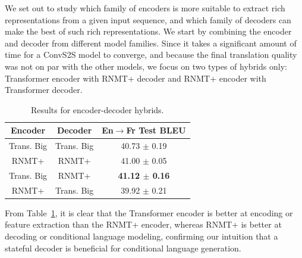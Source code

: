 \documentclass[11pt,a4paper]{article}
\begin{document}
We set out to study which family of encoders
is more suitable to extract rich representations from a given input sequence,
and which family of decoders can make the best of such rich representations.
We start by combining the encoder and decoder from different
model families. Since it takes a significant amount of time for a
ConvS2S model to converge, and because the final translation quality
was not on par with the other models, we focus on two types of
hybrids only: Transformer encoder with RNMT+ decoder and RNMT+ encoder with
Transformer decoder.

\begin{table}[!htbp]
\centering
\begin{tabular}{c|c|c}
\hline \hline
Encoder & Decoder & En$\rightarrow$Fr Test BLEU \\ \hline
Trans. Big    & Trans. Big                    & 40.73 $\pm$ 0.19     \\
RNMT+    & RNMT+                    & 41.00 $\pm$ 0.05     \\
Trans. Big    & RNMT+                    & \textbf{41.12 $\pm$ 0.16}     \\
RNMT+     & Trans. Big          & 39.92 $\pm$ 0.21      \\ \hline
\end{tabular}
\caption{Results for encoder-decoder hybrids.}
\label{table:hybrids_encdec}
\end{table}

From Table~\ref{table:hybrids_encdec}, it is clear that the Transformer
encoder is better at encoding or feature extraction than the RNMT+
encoder, whereas RNMT+ is better at decoding or conditional language
modeling, confirming our intuition that a stateful decoder is
beneficial for conditional language generation.

\end{document}
